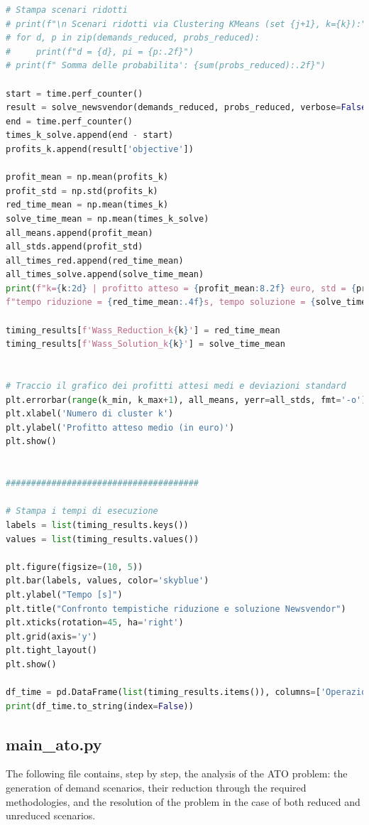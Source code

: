 \documentclass[a4paper,12pt]{article}
\begin{document}
\begin{lstlisting}[language=python,caption={Main of Newvendor problem},label={lst:main-nv}]
# Stampa scenari ridotti 
# print(f"\n Scenari ridotti via Clustering KMeans (set {j+1}, k={k}):")
# for d, p in zip(demands_reduced, probs_reduced):
#     print(f"d = {d}, pi = {p:.2f}")
# print(f" Somma delle probabilita': {sum(probs_reduced):.2f}")

start = time.perf_counter()
result = solve_newsvendor(demands_reduced, probs_reduced, verbose=False)
end = time.perf_counter()
times_k_solve.append(end - start)
profits_k.append(result['objective'])

profit_mean = np.mean(profits_k)
profit_std = np.std(profits_k)    
red_time_mean = np.mean(times_k)
solve_time_mean = np.mean(times_k_solve)
all_means.append(profit_mean)
all_stds.append(profit_std)
all_times_red.append(red_time_mean)
all_times_solve.append(solve_time_mean)
print(f"k={k:2d} | profitto atteso = {profit_mean:8.2f} euro, std = {profit_std:6.2f} euro, "
f"tempo riduzione = {red_time_mean:.4f}s, tempo soluzione = {solve_time_mean:.4f}s")

timing_results[f'Wass_Reduction_k{k}'] = red_time_mean
timing_results[f'Wass_Solution_k{k}'] = solve_time_mean


# Traccio il grafico dei profitti attesi medi e deviazioni standard
plt.errorbar(range(k_min, k_max+1), all_means, yerr=all_stds, fmt='-o')
plt.xlabel('Numero di cluster k')
plt.ylabel('Profitto atteso medio (in euro)')
plt.show()


######################################

# Stampa i tempi di esecuzione
labels = list(timing_results.keys())
values = list(timing_results.values())

plt.figure(figsize=(10, 5))
plt.bar(labels, values, color='skyblue')
plt.ylabel("Tempo [s]")
plt.title("Confronto tempistiche riduzione e soluzione Newsvendor")
plt.xticks(rotation=45, ha='right')
plt.grid(axis='y')
plt.tight_layout()
plt.show()

df_time = pd.DataFrame(list(timing_results.items()), columns=['Operazione', 'Tempo [s]'])
print(df_time.to_string(index=False))


\end{lstlisting}

\subsection{main\_ato.py}
The following file contains, step by step, the analysis of the ATO problem: the generation of demand scenarios, their reduction through the required methodologies, and the resolution of the problem in the case of both reduced and unreduced scenarios.
\end{document}
